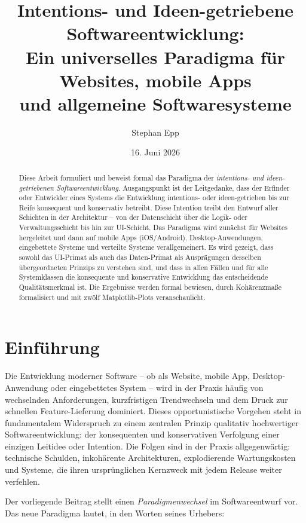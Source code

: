﻿\documentclass[a4paper,12pt]{article}
\title{\textbf{Intentions- und Ideen-getriebene Softwareentwicklung:}\\
\large Ein universelles Paradigma für Websites, mobile Apps\\
und allgemeine Softwaresysteme}
\author{Stephan Epp}
\date{16. Juni 2026}
\theoremstyle{definition}
\begin{document}
\maketitle

\begin{abstract}
Diese Arbeit formuliert und beweist formal das Paradigma der
\emph{intentions- und ideen-getriebenen Softwareentwicklung}. Ausgangspunkt ist
der Leitgedanke, dass der Erfinder oder Entwickler eines Systems die Entwicklung
intentions- oder ideen-getrieben bis zur Reife konsequent und konservativ betreibt.
Diese Intention treibt den Entwurf aller Schichten in der Architektur -- von der
Datenschicht über die Logik- oder Verwaltungsschicht bis hin zur UI-Schicht. Das
Paradigma wird zunächst für Websites hergeleitet und dann auf mobile Apps
(iOS/Android), Desktop-Anwendungen, eingebettete Systeme und verteilte Systeme
verallgemeinert. Es wird gezeigt, dass sowohl das UI-Primat als auch das
Daten-Primat als Ausprägungen desselben übergeordneten Prinzips zu verstehen
sind, und dass in allen Fällen und für alle Systemklassen die konsequente und
konservative Entwicklung das entscheidende Qualitätsmerkmal ist. Die Ergebnisse
werden formal bewiesen, durch Kohärenzmaße formalisiert und mit zwölf
Matplotlib-Plots veranschaulicht.
\end{abstract}

\tableofcontents
\newpage

\section{Einführung}

Die Entwicklung moderner Software -- ob als Website, mobile App, Desktop-Anwendung
oder eingebettetes System -- wird in der Praxis häufig von wechselnden
Anforderungen, kurzfristigen Trendwechseln und dem Druck zur schnellen
Feature-Lieferung dominiert. Dieses opportunistische Vorgehen steht in
fundamentalem Widerspruch zu einem zentralen Prinzip qualitativ hochwertiger
Softwareentwicklung: der konsequenten und konservativen Verfolgung einer
einzigen Leitidee oder Intention. Die Folgen sind in der Praxis allgegenwärtig:
technische Schulden, inkohärente Architekturen, explodierende Wartungskosten
und Systeme, die ihren ursprünglichen Kernzweck mit jedem Release weiter
verfehlen.

Der vorliegende Beitrag stellt einen \emph{Paradigmenwechsel} im Softwareentwurf
vor. Das neue Paradigma lautet, in den Worten seines Urhebers:
\end{document}
